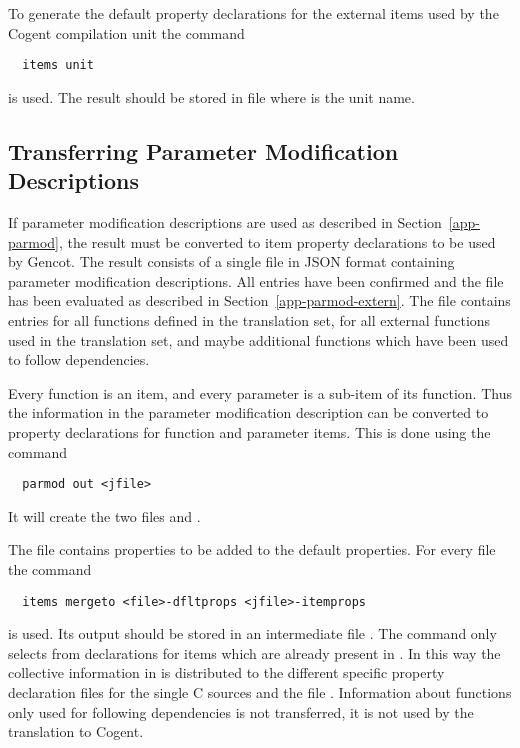 To generate the default property declarations for the external items used by the Cogent compilation unit the command
\begin{verbatim}
  items unit
\end{verbatim}
is used. The result should be stored in file  where  is the unit name. 

\subsection{Transferring Parameter Modification Descriptions}
\label{app-items-parmod}

If parameter modification descriptions are used as described in Section~\ref{app-parmod}, the result must be converted to item
property declarations to be used by Gencot. The result consists of a single file  in JSON format containing 
parameter modification descriptions. All entries have been confirmed and the file has been evaluated as described in 
Section~\ref{app-parmod-extern}. The file contains entries for all functions defined in the translation set, for all external 
functions used in the translation set, and maybe additional functions which have been used to follow dependencies.

Every function is an item, and every parameter is a sub-item of its function. Thus the information in the parameter modification
description can be converted to property declarations for function and parameter items. This is done using the command
\begin{verbatim}
  parmod out <jfile>
\end{verbatim}
It will create the two files  and . 

The file  contains properties to be added to the default properties. For every file 
the command 
\begin{verbatim}
  items mergeto <file>-dfltprops <jfile>-itemprops
\end{verbatim}
is used. Its output should be stored in an intermediate file . The command only selects from 
 declarations for items which are already present in
. In this way the collective information in  is distributed to the different
specific property declaration files for the single C sources and the file . Information about functions
only used for following dependencies is not transferred, it is not used by the translation to Cogent.

